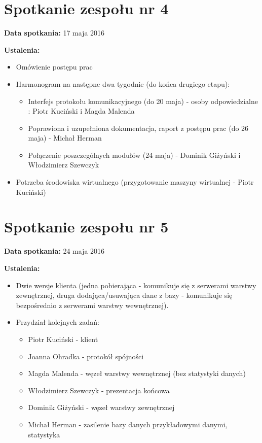 \section{Spotkanie zespołu nr 4}

\textbf{Data spotkania:} 17 maja 2016

\textbf{Ustalenia:}

\begin{itemize}
\item Omówienie postępu prac
\item Harmonogram na następne dwa tygodnie (do końca drugiego etapu):
	\begin{itemize}
	\item Interfejs protokołu komunikacyjnego (do 20 maja) - osoby odpowiedzialne : Piotr Kuciński i Magda Malenda
	\item Poprawiona i uzupełniona dokumentacja, raport z postępu prac (do 26 maja) - Michał Herman
	\item Połączenie poszczególnych modułów (24 maja) - Dominik Giżyński i Włodzimierz Szewczyk
	\end{itemize}
\item Potrzeba środowiska wirtualnego (przygotowanie maszyny wirtualnej - Piotr Kuciński)
\end{itemize}


\section{Spotkanie zespołu nr 5}

\textbf{Data spotkania:} 24 maja 2016

\textbf{Ustalenia:}

\begin{itemize}
\item Dwie wersje klienta (jedna pobierająca - komunikuje się z serwerami warstwy zewnętrznej, druga dodająca/usuwająca dane z bazy - komunikuje się bezpośrednio z serwerami warstwy wewnętrznej).
\item Przydział kolejnych zadań:
	\begin{itemize}
	\item Piotr Kuciński - klient
	\item Joanna Ohradka - protokół spójności
	\item Magda Malenda - węzeł warstwy wewnętrznej (bez statystyki danych)
	\item Włodzimierz Szewczyk - prezentacja końcowa
	\item Dominik Giżyński - węzeł warstwy zewnętrznej
	\item Michał Herman - zasilenie bazy danych przykładowymi danymi, statystyka
	\end{itemize}
\end{itemize}